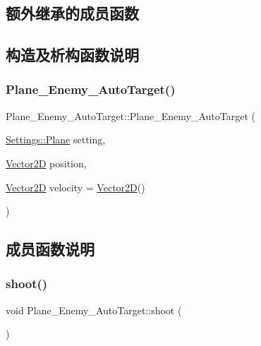 \subsection*{额外继承的成员函数}


\subsection{构造及析构函数说明}
\mbox{\label{class_plane___enemy___auto_target_abf4224e6d4c79583016c98dc8747f3ad}} 
\subsubsection{\texorpdfstring{Plane\+\_\+\+Enemy\+\_\+\+Auto\+Target()}{Plane\_Enemy\_AutoTarget()}}
{\footnotesize\ttfamily Plane\+\_\+\+Enemy\+\_\+\+Auto\+Target\+::\+Plane\+\_\+\+Enemy\+\_\+\+Auto\+Target (\begin{DoxyParamCaption}\item[{\hyperlink{struct_settings_1_1_plane}{Settings\+::\+Plane}}]{setting,  }\item[{\hyperlink{_vector2_d_8hpp_aa1f1145650f1dd9bddf7335ec6434d7c}{Vector2D}}]{position,  }\item[{\hyperlink{_vector2_d_8hpp_aa1f1145650f1dd9bddf7335ec6434d7c}{Vector2D}}]{velocity = {\ttfamily \hyperlink{_vector2_d_8hpp_aa1f1145650f1dd9bddf7335ec6434d7c}{Vector2D}()} }\end{DoxyParamCaption})}



\subsection{成员函数说明}
\mbox{\label{class_plane___enemy___auto_target_a002ba5754abc49b37ab3131f1a8f48c7}} 
\subsubsection{\texorpdfstring{shoot()}{shoot()}}
{\footnotesize\ttfamily void Plane\+\_\+\+Enemy\+\_\+\+Auto\+Target\+::shoot (\begin{DoxyParamCaption}{ }\end{DoxyParamCaption})\hspace{0.3cm}{\ttfamily [virtual]}}



